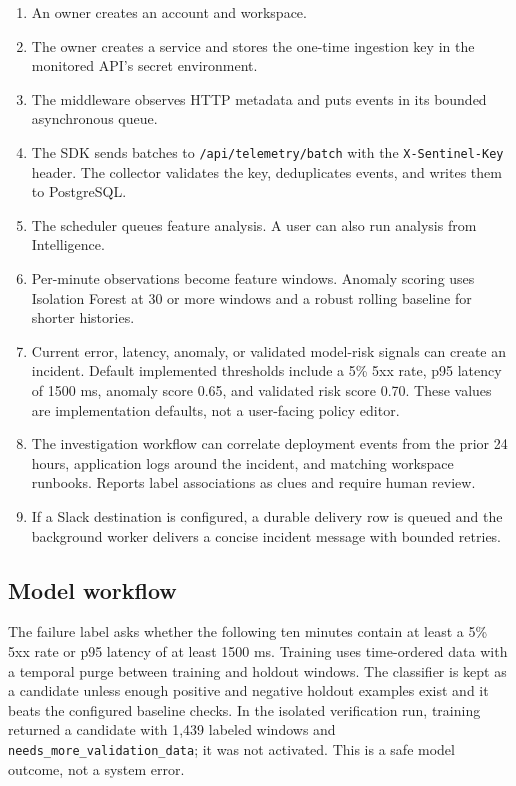 \documentclass[11pt,a4paper]{article}
\begin{document}
\begin{enumerate}
  \item An owner creates an account and workspace.
  \item The owner creates a service and stores the one-time ingestion key in the
  monitored API's secret environment.
  \item The middleware observes HTTP metadata and puts events in its bounded
  asynchronous queue.
  \item The SDK sends batches to \texttt{/api/telemetry/batch} with the
  \texttt{X-Sentinel-Key} header. The collector validates the key, deduplicates
  events, and writes them to PostgreSQL.
  \item The scheduler queues feature analysis. A user can also run analysis
  from Intelligence.
  \item Per-minute observations become feature windows. Anomaly scoring uses
  Isolation Forest at 30 or more windows and a robust rolling baseline for
  shorter histories.
  \item Current error, latency, anomaly, or validated model-risk signals can
  create an incident. Default implemented thresholds include a 5\% 5xx rate,
  p95 latency of 1500 ms, anomaly score 0.65, and validated risk score 0.70.
  These values are implementation defaults, not a user-facing policy editor.
  \item The investigation workflow can correlate deployment events from the
  prior 24 hours, application logs around the incident, and matching workspace
  runbooks. Reports label associations as clues and require human review.
  \item If a Slack destination is configured, a durable delivery row is queued
  and the background worker delivers a concise incident message with bounded
  retries.
\end{enumerate}

\subsection{Model workflow}
The failure label asks whether the following ten minutes contain at least a
5\% 5xx rate or p95 latency of at least 1500 ms. Training uses time-ordered data
with a temporal purge between training and holdout windows. The classifier is
kept as a candidate unless enough positive and negative holdout examples exist
and it beats the configured baseline checks. In the isolated verification run,
training returned a candidate with 1,439 labeled windows and
\texttt{needs\_more\_validation\_data}; it was not activated. This is a safe
model outcome, not a system error.
\end{document}
